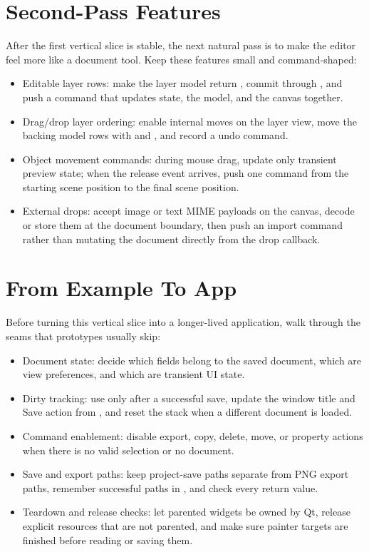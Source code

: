 \section{Second-Pass Features}

After the first vertical slice is stable, the next natural pass is to make the editor feel more like a document tool. Keep these features small and command-shaped:

\begin{itemize}
\item Editable layer rows: make the layer model return , commit through , and push a  command that updates state, the model, and the canvas together.
\item Drag/drop layer ordering: enable internal moves on the layer view, move the backing model rows with  and , and record a  undo command.
\item Object movement commands: during mouse drag, update only transient preview state; when the release event arrives, push one  command from the starting scene position to the final scene position.
\item External drops: accept image or text MIME payloads on the canvas, decode or store them at the document boundary, then push an import command rather than mutating the document directly from the drop callback.
\end{itemize}

\section{From Example To App}

Before turning this vertical slice into a longer-lived application, walk through the seams that prototypes usually skip:

\begin{itemize}
\item Document state: decide which fields belong to the saved document, which are view preferences, and which are transient UI state.
\item Dirty tracking: use  only after a successful save, update the window title and Save action from , and reset the stack when a different document is loaded.
\item Command enablement: disable export, copy, delete, move, or property actions when there is no valid selection or no document.
\item Save and export paths: keep project-save paths separate from PNG export paths, remember successful paths in , and check every  return value.
\item Teardown and release checks: let parented widgets be owned by Qt, release explicit resources that are not parented, and make sure painter targets are finished before reading or saving them.
\end{itemize}


